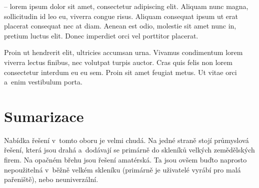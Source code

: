  
\noindent{} -- lorem ipsum dolor sit amet, consectetur adipiscing elit.
Aliquam nunc magna, sollicitudin id leo eu, viverra congue risus.
Aliquam consequat ipsum ut erat placerat consequat nec at diam. 
Aenean est odio, molestie sit amet nunc in, pretium luctus elit. 
Donec imperdiet orci vel porttitor placerat. 


\noindent Proin ut hendrerit elit, ultricies accumsan urna. 
Vivamus condimentum lorem viverra lectus finibus, nec volutpat turpis auctor.
Cras quis felis non lorem consectetur interdum eu eu sem. 
Proin sit amet feugiat metus. 
Ut vitae orci a~enim vestibulum porta. \newline

\section{Sumarizace}
Nabídka řešení v~tomto oboru je velmi chudá.
Na jedné straně stojí průmyslová řešení, která jsou drahá a~dodávají se primárně do skleníků velkých zemědělských firem.
Na opačném břehu jsou řešení amatérská. 
Ta jsou ovšem buďto naprosto nepoužitelná v~běžně velkém skleníku (primárně je uživatelé vyrábí pro malá pařeniště), nebo neuniverzální.

\newpage